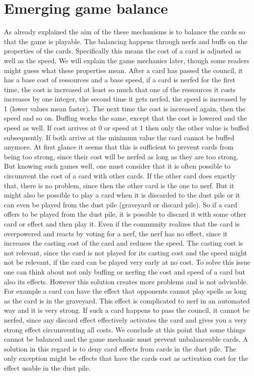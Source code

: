 \documentclass{article}
\begin{document}
\section{Emerging game balance}
%
As already explained the aim of the these mechanisms is to balance the cards so that the game is playable. The balancing happens through nerfs and buffs on the properties of the cards. Specifically this means the cost of a card is adjusted as well as the speed. We will explain the game mechanics later, though some readers might guess what these properties mean. After a card has passed the council, it has a base cost of ressources and a base speed, if a card is nerfed for the first time, the cost is increased at least so much that one of the ressources it costs increases by one integer, the second time it gets nerfed, the speed is increased by 1 (lower values mean faster). The next time the cost is increased again, then the speed and so on. Buffing works the same, except that the cost is lowered and the speed as well. If cost arrives at 0 or speed at 1 then only the other value is buffed subsequently. If both arrive at the minimum value the card cannot be buffed anymore. At first glance it seems that this is sufficient to prevent cards from being too strong, since their cost will be nerfed as long as they are too strong. But knowing such games well, one must consider that it is often possible to circumvent the cost of a card with other cards. If the other card does exactly that, there is no problem, since then the other card is the one to nerf. But it might also be possible to play a card when it is discarded to the dust pile or it can even be played from the dust pile (graveyard or discard pile). So if a card offers to be played from the dust pile, it is possible to discard it with some other card or effect and then play it. Even if the community realizes that the card is overpowered and reacts by voting for a nerf, the nerf has no effect, since it increases the casting cost of the card and reduces the speed. The casting cost is not relevant, since the card is not played for its casting cost and the speed might not be relevant, if the card can be played very early at no cost. To solve this issue one can think about not only buffing or nerfing the cost and speed of a card but also its effects. However this solution creates more problems and is not advisable. For example a card can have the effect that opponents cannot play spells as long as the card is in the graveyard. This effect is complicated to nerf in an automated way and it is very strong. If such a card happens to pass the council, it cannot be nerfed, since any discard effect effectively activates the card and gives you a very strong effect circumventing all costs. We conclude at this point that some things cannot be balanced and the game mechanic must prevent unbalanceable cards. A solution in this regard is to deny card effects from cards in the dust pile. The only exception might be effects that have the cards cost as activation cost for the effect usable in the dust pile. \newline
\end{document}
